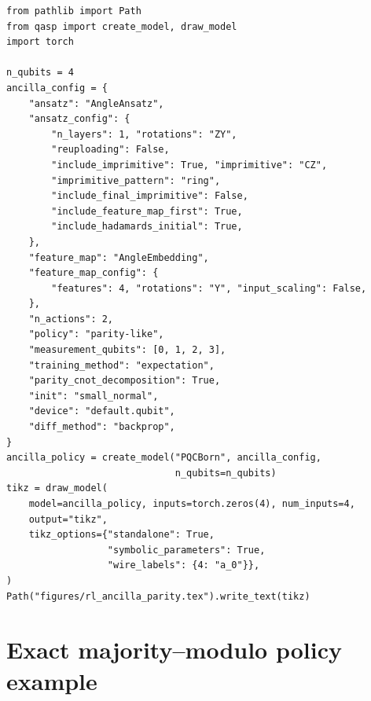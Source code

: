 \documentclass[10pt]{article}
\begin{document}
\begin{lstlisting}[caption={Building and drawing a binary ancilla-parity policy.  The generated circuit is \cref{fig:rl-ancilla-circuit}.},label={lst:ancilla-parity}]
from pathlib import Path
from qasp import create_model, draw_model
import torch

n_qubits = 4
ancilla_config = {
    "ansatz": "AngleAnsatz",
    "ansatz_config": {
        "n_layers": 1, "rotations": "ZY",
        "reuploading": False,
        "include_imprimitive": True, "imprimitive": "CZ",
        "imprimitive_pattern": "ring",
        "include_final_imprimitive": False,
        "include_feature_map_first": True,
        "include_hadamards_initial": True,
    },
    "feature_map": "AngleEmbedding",
    "feature_map_config": {
        "features": 4, "rotations": "Y", "input_scaling": False,
    },
    "n_actions": 2,
    "policy": "parity-like",
    "measurement_qubits": [0, 1, 2, 3],
    "training_method": "expectation",
    "parity_cnot_decomposition": True,
    "init": "small_normal",
    "device": "default.qubit",
    "diff_method": "backprop",
}
ancilla_policy = create_model("PQCBorn", ancilla_config,
                              n_qubits=n_qubits)
tikz = draw_model(
    model=ancilla_policy, inputs=torch.zeros(4), num_inputs=4,
    output="tikz",
    tikz_options={"standalone": True,
                  "symbolic_parameters": True,
                  "wire_labels": {4: "a_0"}},
)
Path("figures/rl_ancilla_parity.tex").write_text(tikz)
\end{lstlisting}

\section{Exact majority--modulo policy example}
\label{app:majority}
\end{document}
